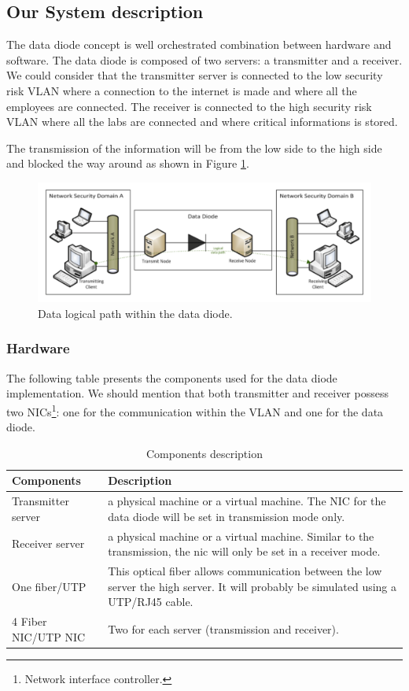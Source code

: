 \documentclass[a4paper,10pt]{article}
\begin{document}
\subsection{Our System description}
The data diode concept is well orchestrated combination between hardware and software. The data diode is composed of two servers: a transmitter and a receiver. We could consider that the transmitter server is connected to the low security risk VLAN where a connection to the internet is made and where all the employees are connected. The receiver is connected to the high security risk VLAN where all the labs are connected and where critical informations is stored.

The transmission of the information will be from the low side to the high side and blocked the way around as shown in Figure \ref{fig:UDPDD}.

\begin{figure}
\centering
\includegraphics[scale=0.5]{images/logical-scheme-DD.png}
\caption{Data logical path within the data diode.}
\label{fig:UDPDD}
\end{figure}

\subsubsection{Hardware}
The following table presents the components used for the data diode implementation. We should mention that both transmitter and receiver possess two NICs\footnote{Network interface controller.}: one for the communication within the VLAN and one for the data diode.\bigskip
\begin{table}[!h]
\begin{tabular}{|p{3cm}|p{10.5cm}|}
	\hline
	\textbf{Components} & \textbf{Description}                 \\
	\hline
	Transmitter server  &  a physical machine or a virtual machine. The NIC for the data diode will be set in transmission mode only. \\
	\hline
	Receiver server  &  a physical machine or a virtual machine. Similar to the transmission, the nic will only be set in a receiver mode.\\
	\hline
	One fiber/UTP & This optical fiber allows communication between the low server the high server. It will probably be simulated using a UTP/RJ45 cable.\\
	\hline
	4 Fiber NIC/UTP NIC & Two for each server (transmission and receiver).  \\
	\hline
\end{tabular}
\caption{Components description}
\label{tab:component}
\end{table}
\end{document}
